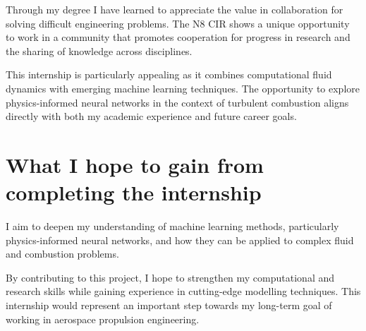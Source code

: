 \documentclass[../main.tex]{subfiles}
\begin{document}
Through my degree I have learned to appreciate the value in collaboration for solving difficult engineering problems. The N8 CIR shows a unique opportunity to work in a community that promotes cooperation for progress in research and the sharing of knowledge across disciplines.\par

This internship is particularly appealing as it combines computational fluid dynamics with emerging machine learning techniques. The opportunity to explore physics-informed neural networks in the context of turbulent combustion aligns directly with both my academic experience and future career goals.




\section*{What I hope to gain from completing the internship}

I aim to deepen my understanding of machine learning methods, particularly physics-informed neural networks, and how they can be applied to complex fluid and combustion problems.\par

By contributing to this project, I hope to strengthen my computational and research skills while gaining experience in cutting-edge modelling techniques. This internship would represent an important step towards my long-term goal of working in aerospace propulsion engineering.\par
\end{document}
